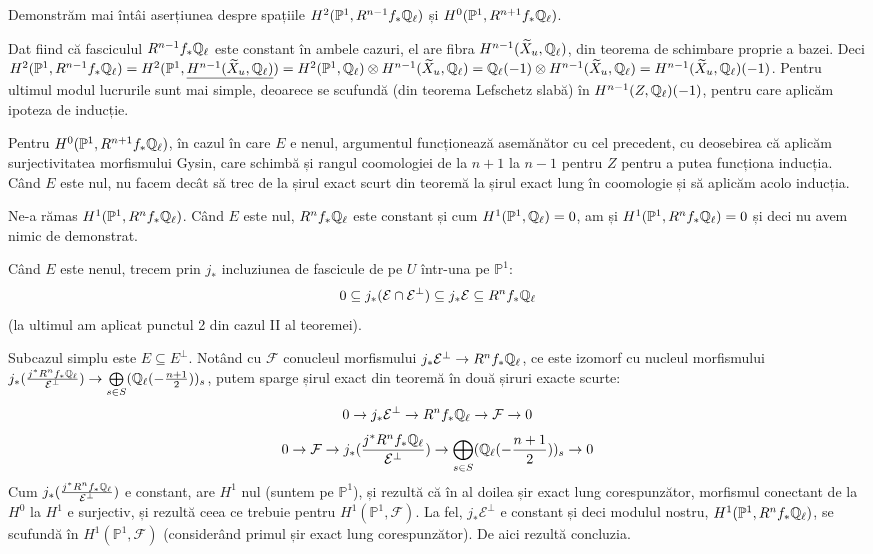 \documentclass[13pt,openany,oneside]{book}
\begin{document}
Demonstrăm mai întâi aserțiunea despre spațiile $H^2(\mathbb{P}^1,R^{n-1} f_* \mathbb{Q}_\ell)$ și $H^0(\mathbb{P}^1,R^{n+1} f_* \mathbb{Q}_\ell)$.

Dat fiind că fasciculul $R^{n-1} f_* \mathbb{Q}_\ell$ este constant în ambele cazuri, el are fibra $H^{n-1}(\widetilde{X}_u,\mathbb{Q}_\ell)$, din teorema de schimbare proprie a bazei. Deci $H^2(\mathbb{P}^1,R^{n-1} f_* \mathbb{Q}_\ell) = H^2(\mathbb{P}^1,\underline{H^{n-1}(\widetilde{X}_u,\mathbb{Q}_\ell)}) = H^2(\mathbb{P}^1,\mathbb{Q}_\ell) \otimes H^{n-1}(\widetilde{X}_u,\mathbb{Q}_\ell) = \mathbb{Q}_\ell(-1)\otimes H^{n-1}(\widetilde{X}_u,\mathbb{Q}_\ell) = H^{n-1}(\widetilde{X}_u,\mathbb{Q}_\ell)(-1)$. Pentru ultimul modul lucrurile sunt mai simple, deoarece se scufundă (din teorema Lefschetz slabă) în $H^{n-1}(Z,\mathbb{Q}_\ell)(-1)$, pentru care aplicăm ipoteza de inducție.

Pentru $H^0(\mathbb{P}^1,R^{n+1} f_* \mathbb{Q}_\ell)$, în cazul în care $E$ e nenul, argumentul funcționează asemănător cu cel precedent, cu deosebirea că aplicăm surjectivitatea morfismului Gysin, care schimbă și rangul coomologiei de la $n+1$ la $n-1$ pentru $Z$ pentru a putea funcționa inducția. Când $E$ este nul, nu facem decât să trec de la șirul exact scurt din teoremă la șirul exact lung în coomologie și să aplicăm acolo inducția.

Ne-a rămas $H^1(\mathbb{P}^1,R^n f_* \mathbb{Q}_\ell)$. Când $E$ este nul, $R^{n} f_* \mathbb{Q}_\ell$ este constant și cum $H^1(\mathbb{P}^1,\mathbb{Q}_\ell)=0$, am și $H^1(\mathbb{P}^1,R^n f_* \mathbb{Q}_\ell)=0$ și deci nu avem nimic de demonstrat.

Când $E$ este nenul, trecem prin $j_*$ incluziunea de fascicule de pe $U$ într-una pe $\mathbb{P}^1$:
$$0 \subseteq j_*(\mathcal{E} \cap \mathcal{E}^\perp) \subseteq j_*\mathcal{E} \subseteq R^n f_* \mathbb{Q}_\ell$$
(la ultimul am aplicat punctul 2 din cazul II al teoremei).

Subcazul simplu este $E \subseteq E^\perp$. Notând cu $\mathcal{F}$ conucleul morfismului $j_* \mathcal{E}^\perp \rightarrow R^n f_* \mathbb{Q}_\ell$, ce este izomorf cu nucleul morfismului $j_*(\frac{j^* R^n f_* \mathbb{Q}_\ell}{\mathcal{E}^\perp}) \rightarrow \bigoplus\limits_{s\in S} (\mathbb{Q}_\ell(-\frac{n+1}{2}))_s$, putem sparge șirul exact din teoremă în două șiruri exacte scurte:
$$0 \rightarrow j_* \mathcal{E}^\perp \rightarrow R^n f_* \mathbb{Q}_\ell \rightarrow \mathcal{F} \rightarrow 0$$
$$0 \rightarrow \mathcal{F} \rightarrow j_*(\frac{j^* R^n f_* \mathbb{Q}_\ell}{\mathcal{E}^\perp}) \rightarrow \bigoplus\limits_{s\in S} (\mathbb{Q}_\ell(-\frac{n+1}{2}))_s \rightarrow 0$$
Cum $ j_*(\frac{j^* R^n f_* \mathbb{Q}_\ell}{\mathcal{E}^\perp})$ e constant, are $H^1$ nul (suntem pe $\mathbb{P}^1$), și rezultă că în al doilea șir exact lung corespunzător, morfismul conectant de la $H^0$ la $H^1$ e surjectiv, și rezultă ceea ce trebuie pentru $H^1(\mathbb{P}^1,\mathcal{F})$. La fel, $ j_* \mathcal{E}^\perp$ e constant și deci modulul nostru, $H^1(\mathbb{P}^1,R^n f_* \mathbb{Q}_\ell)$, se scufundă în $H^1(\mathbb{P}^1,\mathcal{F})$ (considerând primul șir exact lung corespunzător). De aici rezultă concluzia.
\end{document}
